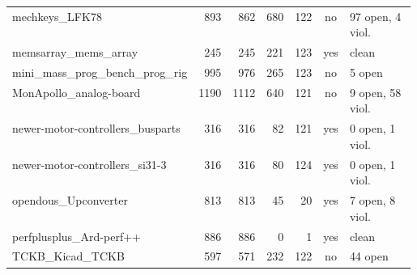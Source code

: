 \begin{longtable}{@{}p{0.36\linewidth}rrrrcp{0.22\linewidth}@{}}
mechkeys\_\allowbreak{}LFK78 & 893 & 862 & 680 & 122 & \textcolor{frorange}{no} & {\footnotesize 97 open, 4 viol.} \\
memsarray\_\allowbreak{}mems\_\allowbreak{}array & 245 & 245 & 221 & 123 & \textcolor{fraqua}{yes} & {\footnotesize clean} \\
mini\_\allowbreak{}mass\_\allowbreak{}prog\_\allowbreak{}bench\_\allowbreak{}prog\_\allowbreak{}rig & 995 & 976 & 265 & 123 & \textcolor{frorange}{no} & {\footnotesize 5 open} \\
MonApollo\_\allowbreak{}analog-\allowbreak{}board & 1190 & 1112 & 640 & 121 & \textcolor{frorange}{no} & {\footnotesize 9 open, 58 viol.} \\
newer-\allowbreak{}motor-\allowbreak{}controllers\_\allowbreak{}busparts & 316 & 316 & 82 & 121 & \textcolor{fraqua}{yes} & {\footnotesize 0 open, 1 viol.} \\
newer-\allowbreak{}motor-\allowbreak{}controllers\_\allowbreak{}si31-\allowbreak{}3 & 316 & 316 & 80 & 124 & \textcolor{fraqua}{yes} & {\footnotesize 0 open, 1 viol.} \\
opendous\_\allowbreak{}Upconverter & 813 & 813 & 45 & 20 & \textcolor{fraqua}{yes} & {\footnotesize 7 open, 8 viol.} \\
perfplusplus\_\allowbreak{}Ard-\allowbreak{}perf++ & 886 & 886 & 0 & 1 & \textcolor{fraqua}{yes} & {\footnotesize clean} \\
TCKB\_\allowbreak{}Kicad\_\allowbreak{}TCKB & 597 & 571 & 232 & 122 & \textcolor{frorange}{no} & {\footnotesize 44 open} \\
\bottomrule\end{longtable}
